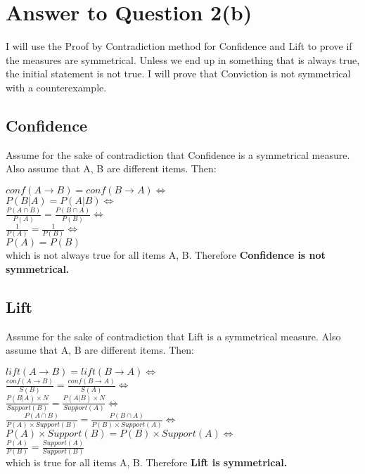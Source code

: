 \documentclass[11pt]{article}
\begin{document}
\section*{Answer to Question 2(b)}
I will use the Proof by Contradiction method for Confidence and Lift to prove if the measures are symmetrical. Unless we end up in something that is always true, the initial statement is not true. I will prove that Conviction is not symmetrical with a counterexample.
\subsection*{Confidence}
Assume for the sake of contradiction that Confidence is a symmetrical measure. Also assume that A, B are different items. Then:\\
\begin{center}
$ conf(A \rightarrow B) =  conf(B \rightarrow A) \Leftrightarrow$ \\
$ P(B|A) = P(A|B) \Leftrightarrow$\\
$ \frac{P(A\cap B)}{P(A)} = \frac{P(B\cap A)}{P(B)}   \Leftrightarrow$\\
$  \frac{1}{P(A)} = \frac{1}{P(B)}\Leftrightarrow$\\
$ P(A) = P(B) $\\
which is not always true for all items A, B. Therefore \textbf{Confidence is not symmetrical.}
\end{center}
\subsection*{Lift}
Assume for the sake of contradiction that Lift is a symmetrical measure. Also assume that A, B are different items. Then:\\
\begin{center}
$ lift(A \rightarrow B) =  lift(B \rightarrow A) \Leftrightarrow$ \\
$ \frac{conf(A \rightarrow B)}{S(B)} =  \frac{conf(B \rightarrow A)}{S(A)} \Leftrightarrow$ \\
$ \frac{P(B|A)\times N}{Support(B)} =  \frac{P(A|B)\times N}{Support(A)} \Leftrightarrow$ \\
$ \frac{P(A\cap B)}{P(A)\times Support(B)} = \frac{P(B\cap A)}{P(B)\times Support(A)}   \Leftrightarrow$\\
$ P(A)\times Support(B) = P(B)\times Support(A) \Leftrightarrow$\\
$ \frac{P(A)}{P(B)} = \frac{Support(A)}{Support(B)}$\\
which is true for all items A, B. Therefore \textbf{Lift is symmetrical.}
\end{center}
\end{document}
